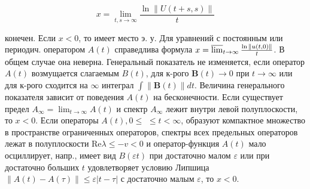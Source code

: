 \documentclass[10pt]{article}
\begin{document}
\[

x=\lim _{t, s \rightarrow \infty} \frac{\ln \|U(t+s, s)\|}{t}

\]



конечен. Если $x<0$, то имеет место э. у. Для уравнений с постоянным или периодич. оператором $A(t)$ справедлива формула $x=\varlimsup_{t \rightarrow \infty} \frac{\ln \|u(t, 0)\|}{t}$. В общем случае она неверна. Генеральный показатель не изменяется, если оператор $A(t)$ возмущается слагаемым $B(t)$, для к-рого $\boldsymbol{B}(t) \rightarrow 0$ при $t \rightarrow \infty$ или для к-рого сходится на $\infty$ интеграл $\int\|\boldsymbol{B}(t)\| d t$. Величина генерального показателя зависит от поведения $A(t)$ на бесконечности. Если существует предел $A_{\infty}=\lim _{t \rightarrow \infty} A(t)$ и спектр $A_{\infty}$ лежит внутри левой полуплоскости, то $x<0$. Если операторы $A(t), 0 \leqslant$ $\leqslant t<\infty$, образуют компактное множество в пространстве ограниченных операторов, спектры всех предельных операторов лежат в полуплоскости $\mathrm{Re} \lambda \leqslant-v<0$ и оператор-функция $A(t)$ мало осциллирует, напр., имеет вид $B(\varepsilon t)$ при достаточно малом $\varepsilon$ или при достаточно больших $t$ удовлетворяет условию Липшица $\|A(t)-A(\tau)\| \leqslant \varepsilon|t-\tau|$ с достаточно малым $\varepsilon$, то $x<0$.
\end{document}
